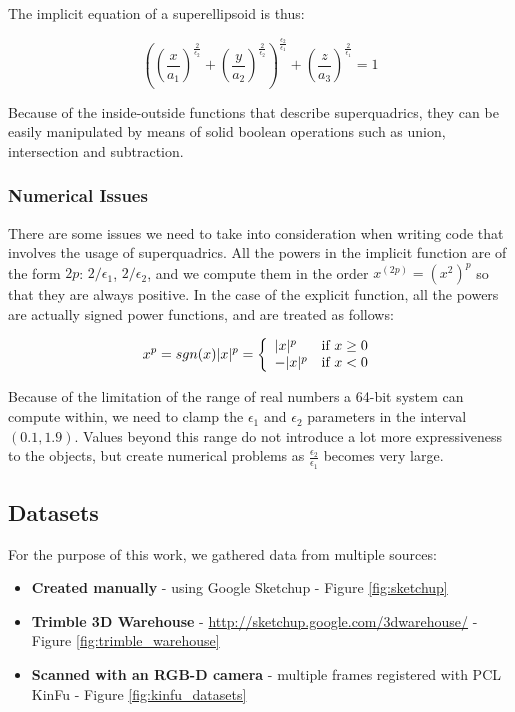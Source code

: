 \documentclass{article}
\begin{document}
The implicit equation of a superellipsoid is thus:

\begin{equation}
\left(\left(\frac{x}{a_1}\right)^{\frac{2}{\epsilon_2}} + \left(\frac{y}{a_2}\right)^{\frac{2}{\epsilon_2}}\right)^{\frac{\epsilon_2}{\epsilon_1}} + \left(\frac{z}{a_3}\right)^{\frac{2}{\epsilon_1}} =1
\end{equation}

Because of the inside-outside functions that describe superquadrics, they can be easily manipulated by means of solid boolean operations such as union, intersection and subtraction.

\subsubsection*{Numerical Issues}
There are some issues we need to take into consideration when writing code that involves the usage of superquadrics. All the powers in the implicit function are of the form $2p$: $2/\epsilon_1$, $2/\epsilon_2$, and we compute them in the order $x^{(2p)}=(x^2)^p$ so that they are always positive. In the case of the explicit function, all the powers are actually signed power functions, and are treated as follows:

\begin{equation}
x^p = sgn(x) |x|^p = \left\{
	\begin{array}{ll}
		|x|^p  & \textnormal{if } x \geq 0 \\
		-|x|^p & \textnormal{if } x < 0
	\end{array}
\right.
\end{equation}


Because of the limitation of the range of real numbers a 64-bit system can compute within, we need to clamp the $\epsilon_1$ and $\epsilon_2$ parameters in the interval $(0.1, 1.9)$. Values beyond this range do not introduce a lot more expressiveness to the objects, but create numerical problems as $\frac{\epsilon_2}{\epsilon_1}$ becomes very large.

\subsection {Datasets}
For the purpose of this work, we gathered data from multiple sources:

\begin{itemize}
	\item{\textbf{Created manually} - using Google Sketchup - Figure \ref {fig:sketchup}}
	\item{\textbf{Trimble 3D Warehouse} - \url{http://sketchup.google.com/3dwarehouse/} - Figure \ref {fig:trimble_warehouse}}
	\item{\textbf{Scanned with an RGB-D camera} - multiple frames registered with PCL KinFu - Figure \ref{fig:kinfu_datasets}}
\end{itemize}
\end{document}

